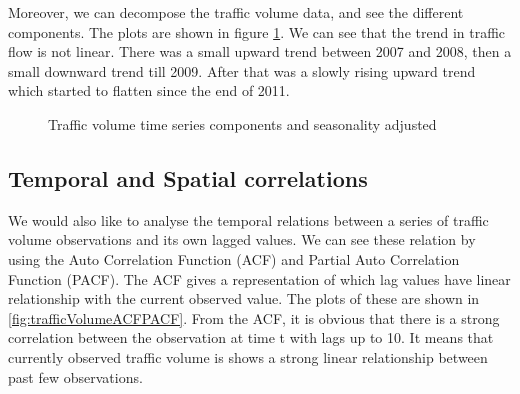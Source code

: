 Moreover, we can decompose the traffic volume data, and see the different components. The plots are
shown in figure \ref{fig:trafficVolumeComponents}. We can see that the trend in traffic flow is not
linear. There was a small upward trend between 2007 and 2008, then a small downward trend till
2009. After that was a slowly rising upward trend which started to flatten since the end of 2011.

\begin{figure}[h]
    \centering
    \qquad
    \caption[Traffic volume time series]{Traffic volume time series components and seasonality adjusted}
   \label{fig:trafficVolumeComponents}
\end{figure}



\subsection{Temporal and Spatial correlations}
We would also like to analyse the temporal relations between a series of traffic volume observations and
its own lagged values. We can see these relation by using the Auto Correlation Function (ACF) and Partial Auto
Correlation Function (PACF). The ACF gives a representation of which lag values have linear relationship
with the current observed value. The plots of these are shown in \ref{fig:trafficVolumeACFPACF}. From the
ACF, it is obvious that there is a strong correlation between the observation at time t with lags
up to 10. It means that currently observed traffic volume is shows a strong linear relationship between
past few observations.

